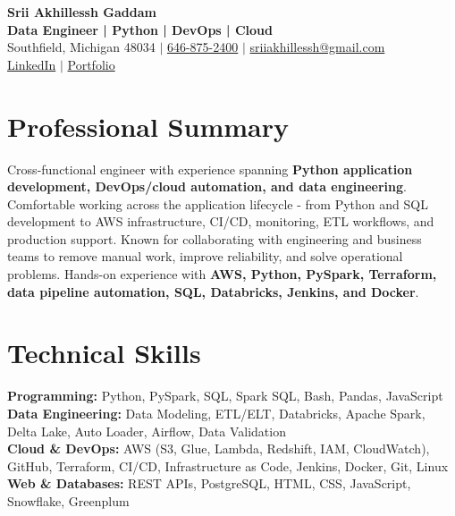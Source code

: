 \documentclass[letterpaper,10pt]{article}
\begin{document}
\fontsize{9.35pt}{10.45pt}\selectfont

\begin{center}
    {\LARGE \textbf{Srii Akhillessh Gaddam}} \\[-1pt]
    \textbf{Data Engineer | Python | DevOps | Cloud} \\[2pt]
    Southfield, Michigan 48034 $|$
    \href{tel:6468752400}{646-875-2400} $|$
    \href{mailto:sriiakhillessh@gmail.com}{sriiakhillessh@gmail.com} \\[1pt]
    \href{https://www.linkedin.com/in/srii-akhiilessh-gaddam-b48668191/}{LinkedIn} $|$
    \href{https://sriiakhillesshg.github.io/portfolio/}{Portfolio}
\end{center}
\vspace{-8pt}

\section{Professional Summary}
\small{Cross-functional engineer with experience spanning \textbf{Python application development, DevOps/cloud automation, and data engineering}. Comfortable working across the application lifecycle - from Python and SQL development to AWS infrastructure, CI/CD, monitoring, ETL workflows, and production support. Known for collaborating with engineering and business teams to remove manual work, improve reliability, and solve operational problems. Hands-on experience with \textbf{AWS, Python, PySpark, Terraform, data pipeline automation, SQL, Databricks, Jenkins, and Docker}.}

\section{Technical Skills}
\small{
\textbf{Programming:} Python, PySpark, SQL, Spark SQL, Bash, Pandas, JavaScript \\
\textbf{Data Engineering:} Data Modeling, ETL/ELT, Databricks, Apache Spark, Delta Lake, Auto Loader, Airflow, Data Validation \\
\textbf{Cloud \& DevOps:} AWS (S3, Glue, Lambda, Redshift, IAM, CloudWatch), GitHub, Terraform, CI/CD, Infrastructure as Code, Jenkins, Docker, Git, Linux \\
\textbf{Web \& Databases:} REST APIs, PostgreSQL, HTML, CSS, JavaScript, Snowflake, Greenplum
}
\end{document}
